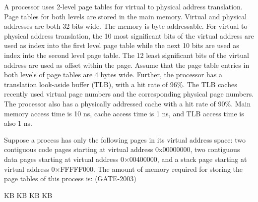 \begin{questyle}

  \question  A processor uses 2-level page tables for virtual to physical address translation. Page tables for
             both levels are stored in the main memory. Virtual and physical addresses are both 32 bits wide.
             The memory is byte addressable. For virtual to physical address translation, the 10 most significant
             bits of the virtual address are used as index into the first level page table while the next 10 bits
             are used as index into the second level page table. The 12 least significant bits of the virtual
             address are used as offset within the page. Assume that the page table entries in both levels of
             page tables are 4 bytes wide. Further, the processor has a translation look-aside buffer (TLB), with a
             hit rate of 96\%. The TLB caches recently used virtual page numbers and the corresponding physical
             page numbers. The processor also has a physically addressed cache with a hit rate of 90\%.
             Main memory access time is 10 ns, cache access time is 1 ns, and TLB access time is also 1 ns.

             Suppose a process has only the following pages in its virtual address space: two contiguous code
             pages starting at virtual address 0x00000000, two contiguous data pages starting at virtual
             address 0×00400000, and a stack page starting at virtual address 0×FFFFF000. The amount of memory
             required for storing the page tables of this process is: (GATE-2003)

            \begin{choices}
               KB
               KB
               KB
               KB
            \end{choices}

\end{questyle}



